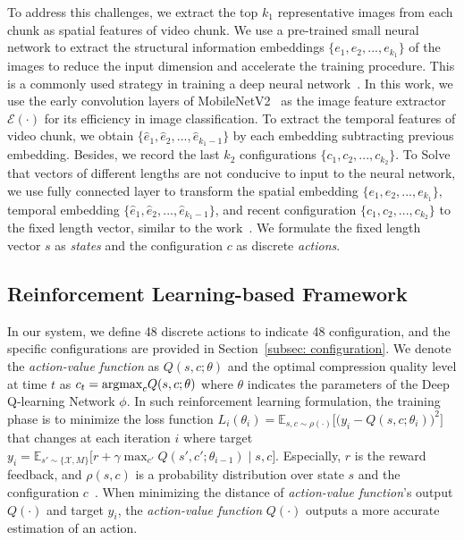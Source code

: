 To address this challenges, we extract the top $k_1$ representative images from each chunk as spatial features of video chunk. We use a pre-trained small neural network to extract the structural information embeddings $ \{e_1,e_2,...,e_{k_1}\} $ of the images to reduce the input dimension and accelerate the training procedure. This is a commonly used strategy in training a deep neural network~\cite{finetunning,finetunning2}. In this work, we use the early convolution layers of MobileNetV2~\cite{MobileNetV2} as the image feature extractor $ \mathcal{E}(\cdot) $ for its efficiency in image classification. To extract the temporal features of video chunk, we obtain $ \{\hat{e}_1,\hat{e}_2,...,\hat{e}_{{k_1}-1}\} $ by each embedding subtracting previous embedding. Besides, we record the last $k_2$ configurations $ \{c_1,c_2,...,c_{k_2}\} $. To Solve that vectors of different lengths are not conducive to input to the neural network, we use fully connected layer to transform the spatial embedding $ \{e_1,e_2,...,e_{k_1}\} $, temporal embedding $ \{\hat{e}_1,\hat{e}_2,...,\hat{e}_{{k_1}-1}\} $, and recent configuration $ \{c_1,c_2,...,c_{k_2}\} $ to the fixed length vector, similar to the work~\cite{pensieve}. We formulate the fixed length vector $ s $ as \emph{states} and the configuration $ c $ as discrete \emph{actions}.

\subsection{Reinforcement Learning-based Framework}

In our system, we define 48 discrete actions to indicate 48 configuration, and the specific configurations are provided in Section~\ref{subsec: configuration}. We denote the \emph{action-value function} as $ Q(s, c; \theta) $ and the optimal compression quality level at time $ t $ as $  c_t = {\rm argmax}_cQ(s, c; \theta) $ where $ \theta $ indicates the parameters of the Deep Q-learning Network $ \phi $. In such reinforcement learning formulation, the training phase is to minimize the loss function $ L_i(\theta_i) = \mathbb{E}_{s, c \sim \rho (\cdot)}\Big[\big(y_i - Q(s, c; \theta_i)\big)^2 \Big] $ that changes at each iteration $ i $ where target $ y_i = \mathbb{E}_{s' \sim \{\mathcal{X}, M\}} \big[ r + \gamma \max_{c'} Q(s', c'; \theta_{i-1}) \mid s, c \big] $. Especially, $ r $ is the reward feedback, and $ \rho(s, c) $ is a probability distribution over state  $ s $ and the configuration $ c $~\cite{DQN}. When minimizing the distance of \emph{action-value function}'s output $ Q(\cdot) $ and target $ y_i $, the \emph{action-value function} $ Q(\cdot) $ outputs a more accurate estimation of an action. 

